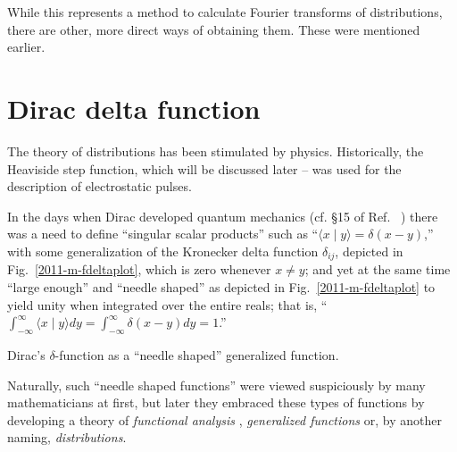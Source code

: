 While this represents a method to calculate  Fourier transforms of distributions, there are other, more direct ways of
obtaining them.
These were mentioned earlier.




\section{Dirac  delta function}



The theory of distributions has been stimulated by physics.
Historically, the Heaviside step function, which will be discussed later --
was used for the description of electrostatic pulses.

In the days when Dirac developed quantum mechanics
(cf. \S 15 of Ref.~ \cite[-10mm]{dirac})
there was a need to define
``singular scalar products'' such as ``$\langle x \mid y \rangle = \delta (x-y)$,''
with some generalization of the Kronecker delta function $\delta_{ij}$, depicted in Fig.~\ref{2011-m-fdeltaplot},
which is zero whenever $x\neq y$;
and yet at the same time ``large enough'' and
``needle shaped'' as depicted in Fig.~\ref{2011-m-fdeltaplot} to yield unity when
integrated over the entire reals; that is, ``$\int_{-\infty}^\infty \langle x \mid y \rangle dy =\int_{-\infty}^\infty \delta (x-y) dy =1$.''
\begin{marginfigure}%
\begin{center}
\end{center}
\caption{Dirac's $\delta$-function as a ``needle shaped'' generalized function.}
  \label{2011-m-fdeltaplot}
\end{marginfigure}


Naturally, such ``needle shaped functions'' were viewed suspiciously by many mathematicians
at first, but later they embraced these types of functions
\cite[0mm]{gelfand:1964:gf} by developing a theory of
{\em functional analysis}
,
{\em generalized functions}
or, by another naming,
{\em distributions}.

